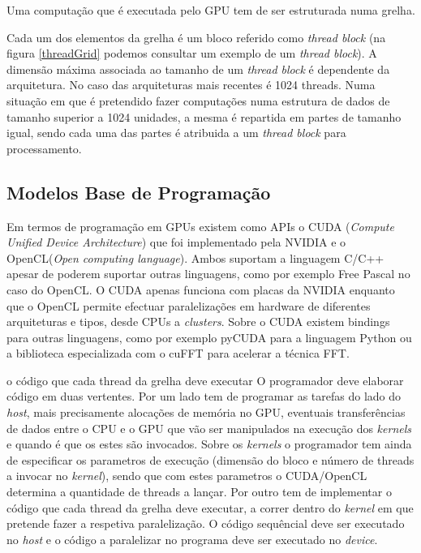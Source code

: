 Uma computação que é executada pelo GPU tem de ser estruturada numa grelha. \par Cada um dos elementos da grelha é um bloco referido como \textit{thread block} (na figura \ref{threadGrid} podemos consultar um exemplo de um \textit{thread block}). A dimensão máxima associada ao tamanho de um \textit{thread block} é dependente da arquitetura. No caso das arquiteturas mais recentes é 1024 threads. Numa situação em que é pretendido fazer computações numa estrutura de dados de tamanho superior a 1024 unidades, a mesma é repartida em partes de tamanho igual, sendo cada uma das partes é atribuida a um \textit{thread block} para processamento. 
 
\subsection{Modelos Base de Programação} 
\label{progGPU}
Em termos de programação em GPUs existem como APIs o CUDA (\textit{Compute Unified Device Architecture})\cite{cudaZone} que foi implementado pela NVIDIA e o OpenCL(\textit{Open computing language})\cite{openCL}. Ambos suportam a linguagem C/C++ apesar de poderem suportar outras linguagens, como por exemplo Free Pascal no caso do OpenCL. O CUDA apenas funciona com placas da NVIDIA enquanto que o OpenCL permite efectuar paralelizações em hardware de diferentes arquiteturas e tipos, desde CPUs a \textit{clusters}. Sobre o CUDA existem bindings para outras linguagens, como por exemplo pyCUDA para a linguagem Python ou a biblioteca especializada com o cuFFT\cite{nvidiaFFT} para acelerar a técnica FFT.  \cite{openclProf}

o código que cada thread da grelha deve executar
 O programador deve elaborar código em duas vertentes. Por um lado tem de programar as tarefas do lado do \textit{host}, mais precisamente alocações de memória no GPU, eventuais transferências de dados entre o CPU e o GPU que vão ser manipulados na execução dos \textit{kernels} e quando é que os estes são invocados. Sobre os \textit{kernels} o programador tem ainda de especificar os parametros de execução (dimensão do bloco e número de threads a invocar no \textit{kernel}), sendo que com estes parametros o CUDA/OpenCL determina a quantidade de threads a lançar. Por outro tem de implementar o código que cada thread da grelha deve executar, a correr dentro do \textit{kernel} em que pretende fazer a respetiva paralelização. O código sequêncial deve ser executado no \textit{host} e o código a paralelizar no programa deve ser executado no \textit{device}.

